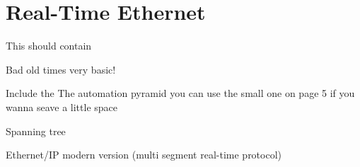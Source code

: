 \chapter{Real-Time Ethernet} \label{ch:realTimeEthernet}

This should contain

Bad old times very basic!

Include the The automation pyramid you can use the small one on page 5 if you wanna seave a little space

Spanning tree

Ethernet/IP modern version (multi segment real-time protocol)